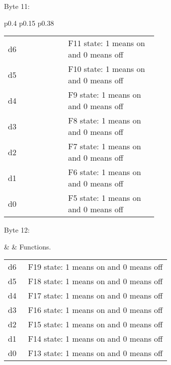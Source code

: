Byte 11:

\begin{tabular}{p{0.4\linewidth} p{0.15\linewidth} p{0.38\linewidth}} 

\begin{tabular}{|p{0.3cm}|p{0.3cm}|p{0.3cm}|p{0.3cm}|p{0.3cm}|p{0.3cm}|p{0.3cm}|p{0.3cm}|}
\hline
0 & d6 & d5 & d4 & d3 & d2 & d1 & d0\\
\hline
\end{tabular}
&  & Functions.\\
\end{tabular}

\begin{tabular}{p{0.05\linewidth} p{0.6\linewidth}} 
d6 & F11 state: 1 means on and 0 means off\\
d5 & F10 state: 1 means on and 0 means off\\
d4 & F9 state: 1 means on and 0 means off\\
d3 & F8 state: 1 means on and 0 means off\\
d2 & F7 state: 1 means on and 0 means off\\
d1 & F6 state: 1 means on and 0 means off\\
d0 & F5 state: 1 means on and 0 means off\\
\end{tabular}

Byte 12:

&  & Functions.\\
\end{tabular}

\begin{tabular}{p{0.05\linewidth} p{0.6\linewidth}} 
d6 & F19 state: 1 means on and 0 means off\\
d5 & F18 state: 1 means on and 0 means off\\
d4 & F17 state: 1 means on and 0 means off\\
d3 & F16 state: 1 means on and 0 means off\\
d2 & F15 state: 1 means on and 0 means off\\
d1 & F14 state: 1 means on and 0 means off\\
d0 & F13 state: 1 means on and 0 means off\\
\end{tabular}


